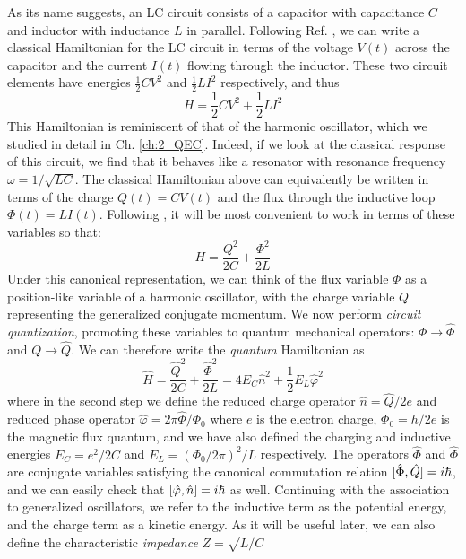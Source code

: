 As its name suggests, an LC circuit consists of a capacitor with capacitance $C$ and inductor with inductance $L$ in parallel. Following Ref. \cite{krantz2019quantum}, we can write a classical Hamiltonian for the LC circuit in terms of the voltage $V(t)$ across the capacitor and the current $I(t)$ flowing through the inductor. These two circuit elements have energies $\frac{1}{2}CV^2$ and $\frac{1}{2}LI^2$ respectively, and thus
\begin{equation}
    H = \frac{1}{2}CV^2 + \frac{1}{2}LI^2
\end{equation}
This Hamiltonian is reminiscent of that of the harmonic oscillator, which we studied in detail in Ch. \ref{ch:2_QEC}. Indeed, if we look at the classical response of this circuit, we find that it behaves like a resonator with resonance frequency $\omega = 1/\sqrt{LC}$. The classical Hamiltonian above can equivalently be written in terms of the charge $Q(t) = CV(t)$ and the flux through the inductive loop $\Phi(t) = LI(t)$. Following \cite{devoret1995quantum}, it will be most convenient to work in terms of these variables so that:
\begin{equation}
    H = \frac{Q^2}{2C} + \frac{\Phi^2}{2L}
\end{equation}
Under this canonical representation, we can think of the flux variable $\Phi$ as a position-like variable of a harmonic oscillator, with the charge variable $Q$ representing the generalized conjugate momentum. We now perform \textit{circuit quantization}, promoting these variables to quantum mechanical operators: $\Phi \to \hat{\Phi}$ and $Q \to \hat{Q}$. We can therefore write the \textit{quantum} Hamiltonian as
\begin{equation}
    \hat{H} = \frac{\hat{Q}^2}{2C} + \frac{\hat{\Phi}^2}{2L} = 4E_C \hat{n}^2 + \frac{1}{2}E_L \hat{\varphi}^2
\end{equation}
where in the second step we define the reduced charge operator $\hat{n} = \hat{Q}/2e$ and reduced phase operator $\hat{\varphi} = 2\pi \hat{\Phi}/\Phi_0$ where $e$ is the electron charge, $\Phi_0 = h/2e$ is the magnetic flux quantum, and we have also defined the charging and inductive energies $E_C = e^2/2C$ and $E_L = (\Phi_0/2\pi)^2/L$ respectively. The operators $\hat{\Phi}$ and $\hat{\Phi}$ are conjugate variables satisfying the canonical commutation relation $[\hat{\Phi}, \hat{Q}] = i\hbar$, and we can easily check that $[\hat{\varphi}, \hat{n}] = i\hbar$ as well. Continuing with the association to generalized oscillators, we refer to the inductive term as the potential energy, and the charge term as a kinetic energy. As it will be useful later, we can also define the characteristic \textit{impedance} $Z = \sqrt{L/C}$

